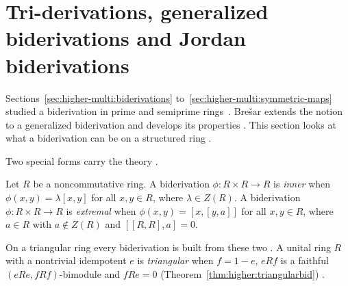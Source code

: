 \section{Tri-derivations, generalized biderivations and Jordan biderivations}\label{sec:higher-multi:tri-generalized}

Sections~\ref{sec:higher-multi:biderivations}
to~\ref{sec:higher-multi:symmetric-maps} studied a biderivation in prime and
semiprime rings~\cite[p.~1952]{Wang2016Bideriv}. Brešar extends the notion to a generalized biderivation and
develops its properties \cite[reference~5]{Bresar1995GBid}. This section looks
at what a biderivation can be on a structured ring
\cite[p.~1952]{Wang2016Bideriv}.

Two special forms carry the theory \cite[p.~1952]{Wang2016Bideriv}.

\begin{definition}\label{def:higher:inner-extremal}
Let $R$ be a noncommutative ring. A biderivation $\phi\colon R\times R\to R$
is \emph{inner} when $\phi(x,y)=\lambda[x,y]$ for all $x,y\in R$, where
$\lambda\in Z(R)$. A biderivation $\phi\colon R\times R\to R$ is
\emph{extremal} when $\phi(x,y)=[x,[y,a]]$ for all $x,y\in R$, where $a\in R$
with $a\notin Z(R)$ and $[[R,R],a]=0$.
\end{definition}

On a triangular ring every biderivation is built from these two
\cite[p.~1955]{Wang2016Bideriv}. A unital ring $R$ with a nontrivial
idempotent $e$ is \emph{triangular} when $f=1-e$, $eRf$ is a faithful
$(eRe,fRf)$-bimodule and $fRe=0$ (Theorem~\ref{thm:higher:triangularbid})
\cite[p.~1953]{Wang2016Bideriv}.

